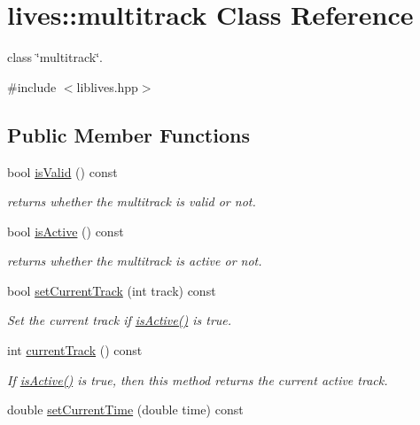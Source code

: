 \hypertarget{classlives_1_1multitrack}{\section{lives\-:\-:multitrack Class Reference}
\label{classlives_1_1multitrack}
}


class \char`\"{}multitrack\char`\"{}.  




{\ttfamily \#include $<$liblives.\-hpp$>$}

\subsection*{Public Member Functions}
\begin{DoxyCompactItemize}
\item 
bool \hyperlink{classlives_1_1multitrack_ab3cfc5e22b91d440a6042edf89128443}{is\-Valid} () const 
\begin{DoxyCompactList}\small\item\em returns whether the multitrack is valid or not. \end{DoxyCompactList}\item 
bool \hyperlink{classlives_1_1multitrack_adeb7b705e8e050f64673e938dddf2e36}{is\-Active} () const 
\begin{DoxyCompactList}\small\item\em returns whether the multitrack is active or not. \end{DoxyCompactList}\item 
bool \hyperlink{classlives_1_1multitrack_a5c460e735627c14a0ed9c7762ec16605}{set\-Current\-Track} (int track) const 
\begin{DoxyCompactList}\small\item\em Set the current track if \hyperlink{classlives_1_1multitrack_adeb7b705e8e050f64673e938dddf2e36}{is\-Active()} is true. \end{DoxyCompactList}\item 
int \hyperlink{classlives_1_1multitrack_afd651f56d20b98bf46d68ccfa25c50e8}{current\-Track} () const 
\begin{DoxyCompactList}\small\item\em If \hyperlink{classlives_1_1multitrack_adeb7b705e8e050f64673e938dddf2e36}{is\-Active()} is true, then this method returns the current active track. \end{DoxyCompactList}\item 
double \hyperlink{classlives_1_1multitrack_ad793b13bd2843823b594e43e0e058a52}{set\-Current\-Time} (double time) const 

\end{DoxyCompactItemize}
